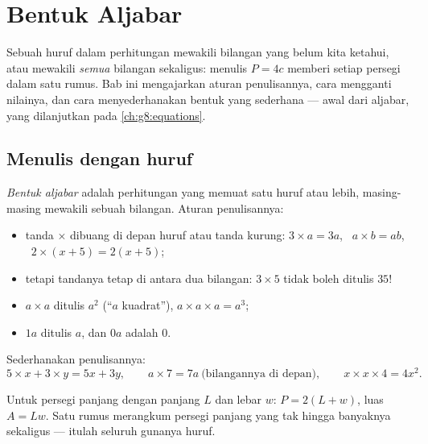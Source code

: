 \chapter{Bentuk Aljabar}\label{ch:g7:literal}

Sebuah huruf dalam perhitungan mewakili bilangan yang belum kita
ketahui, atau mewakili \emph{semua} bilangan sekaligus: menulis
$P = 4c$ memberi  setiap persegi dalam satu rumus. Bab ini
mengajarkan aturan penulisannya, cara mengganti nilainya, dan cara
menyederhanakan bentuk yang sederhana --- awal dari aljabar, yang
dilanjutkan pada \cref{ch:g8:equations}.

\section{Menulis dengan huruf}

\begin{definition}\label{def:g7:literal:def}
\emph{Bentuk aljabar} adalah perhitungan yang
memuat satu huruf atau lebih, masing-masing mewakili sebuah bilangan.
Aturan penulisannya:
\begin{itemize}
  \item tanda $\times$ dibuang di depan huruf atau tanda kurung:
        $3 \times a = 3a$, \ $a \times b = ab$, \
        $2 \times (x + 5) = 2(x + 5)$;
  \item tetapi tandanya tetap di antara dua bilangan: $3 \times 5$
        tidak boleh ditulis $35$!
  \item $a \times a$ ditulis $a^2$ (``$a$ kuadrat''),
        $a \times a \times a = a^3$;
  \item $1a$ ditulis $a$, dan $0a$ adalah $0$.
\end{itemize}
\end{definition}

\begin{example}\label{ex:g7:literal:write}
Sederhanakan penulisannya:
\[
5 \times x + 3 \times y = 5x + 3y,
\qquad
a \times 7 = 7a \ \text{(bilangannya di depan)},
\qquad
x \times x \times 4 = 4x^2 .
\]
\end{example}

\begin{example}[Rumus adalah bentuk aljabar]\label{ex:g7:literal:formulas}
Untuk persegi panjang dengan panjang $L$ dan lebar $w$: 
$P = 2(L + w)$, luas $A = Lw$. Satu rumus merangkum persegi panjang
yang tak hingga banyaknya sekaligus --- itulah seluruh gunanya huruf.
\end{example}

